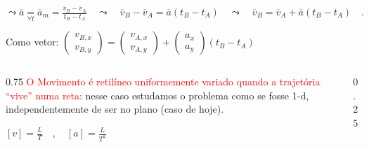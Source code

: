 \documentclass{beamer}
\begin{document}
\begin{frame}{}
		\vspace{0.2cm}
		$\displaystyle \leadsto {\overline{a}} \underset{\forall t}{=} \overline{a}_m = \frac{\overline{v}_B - \overline{v}_A}{t_B - t_A} \quad \leadsto \quad \overline{v}_B - \overline{v}_A = \overline{a}(t_B - t_A) \quad \leadsto \quad \overline{v}_B = \overline{v}_A + \overline{a}(t_B - t_A) \quad . $ 
	
		\hspace{0.5cm} Como vetor: \quad $\displaystyle \begin{pmatrix} v_{B,x} \\ v_{B,y} \end{pmatrix} = \begin{pmatrix} v_{A,x} \\ v_{A,y} \end{pmatrix} + \begin{pmatrix} a_x \\ a_y \end{pmatrix} (t_B - t_A)$
	
		\vspace{0.2cm}
		\begin{columns}[c]
			\begin{column}{0.75\textwidth}
				\textcolor{red}{O Movimento é retilíneo uniformemente variado quando a trajetória ``vive'' numa reta:} nesse caso estudamos o problema como se fosse 1-d, independentemente de ser no plano (caso de hoje).
				
				\vspace{0.2cm}
				$\displaystyle [v] = \frac{L}{T} \quad , \quad [a] = \frac{L}{T^2}$
			\end{column}
			\begin{column}{0.25\textwidth}
				\begin{center}
				\end{center}
			\end{column}
		\end{columns}

	\end{frame}
	
\end{document}
